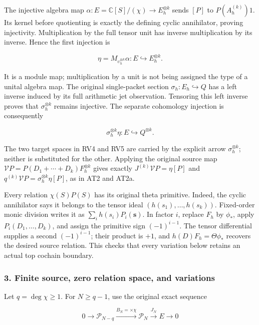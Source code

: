 The injective algebra map \(\alpha:E=\mathbb C[S]/(\chi)\to E_h^{\otimes k}\) sends \([P]\) to \(P(A_h^{(k)})1\). Its kernel before quotienting is exactly the defining cyclic annihilator, proving injectivity. Multiplication by the full tensor unit has inverse multiplication by its inverse. Hence the first injection is

\[
\eta=M_{\upsilon_h^{\otimes k}}\alpha:
E\hookrightarrow E_h^{\otimes k}.
\tag{RV4}
\]

It is a module map; multiplication by a unit is not being assigned the type of a unital algebra map. The original single-packet section \(\sigma_h:E_h\hookrightarrow Q\) has a left inverse induced by its full arithmetic jet observation. Tensoring this left inverse proves that \(\sigma_h^{\otimes k}\) remains injective. The separate cohomology injection is consequently

\[
\sigma_h^{\otimes k}\eta:E\hookrightarrow Q^{\otimes k}.
\tag{RV5}
\]

The two target spaces in RV4 and RV5 are carried by the explicit arrow \(\sigma_h^{\otimes k}\); neither is substituted for the other. Applying the original source map \(\mathcal VP=P(D_1+\cdots+D_k)F_h^{\otimes k}\) gives exactly \(J^{(k)}\mathcal VP=\eta[P]\) and \(q^{(k)}\mathcal VP=\sigma_h^{\otimes k}\eta[P]\), as in AT2 and AT2a.

Every relation \(\chi(S)P(S)\) has its original theta primitive. Indeed, the cyclic annihilator says it belongs to the tensor ideal \((h(s_1),\ldots,h(s_k))\). Fixed-order monic division writes it as \(\sum_i h(s_i)P_i(\mathbf s)\). In factor \(i\), replace \(F_h\) by \(\phi_*\), apply \(P_i(D_1,\ldots,D_k)\), and assign the primitive sign \((-1)^{i-1}\). The tensor differential supplies a second \((-1)^{i-1}\); their product is \(+1\), and \(h(D)F_h=\Theta\phi_*\) recovers the desired source relation. This checks that every variation below retains an actual top cochain boundary.

\subsubsection{3. Finite source, zero relation space, and variations}\label{endpoint-determinant_review--finite-source-zero-relation-space-and-variations}

Let \(q=\deg\chi\ge1\). For \(N\ge q-1\), use the original exact sequence

\[
0\to\mathcal P_{N-q}\xrightarrow{B_N=\times\chi}\mathcal P_N
\xrightarrow{J_N}E\to0
\tag{RV6}
\]

